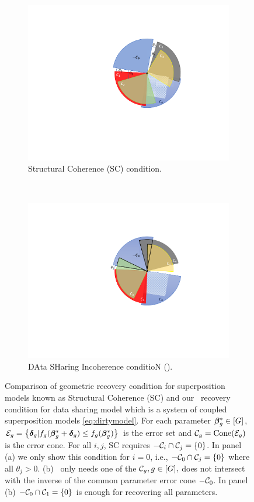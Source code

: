 \begin{figure}[h]
	\centering
	\begin{subfigure}[t]{0.2\textwidth}
		\includegraphics[width=\textwidth]{./img/sc.pdf}
		\caption{Structural Coherence (SC) condition.}\label{fig:sc}
	\end{subfigure} 
	~~~~~~~~
	\begin{subfigure}[t]{0.2\textwidth}
		\includegraphics[width=\textwidth]{./img/deric.pdf}
		\caption{DAta SHaring Incoherence conditioN (\ds).}
		\label{fig:DASHIN}
	\end{subfigure}
	\caption{\small Comparison of geometric recovery condition for superposition models known as Structural Coherence (SC) \cite{guba16} and our \ds\ recovery condition for data sharing model which is a system of coupled superposition models \eqref{eq:dirtymodel}. For each parameter $\boldsymbol{\beta}^*_g \in [G]$, $\cE_g = \left\{\ddelta_g | f_g(\bbeta _g^* + \ddelta_g) \leq f_g(\bbeta _g^*)\right\}$ is the error set and $\cC_g = \text{Cone}(\cE_g)$ is the error cone. For all $i,j$, SC requires $-\cC_i \cap \cC_j = \{0\}$. In panel (a) we only show this condition for $i = 0$, i.e., $-\cC_0 \cap \cC_j = \{0\}$ where all $\theta_j > 0$. (b) \ds\ only needs one of the $\cC_g, g \in [G],$ does not intersect with the inverse of the common parameter error cone $-\cC_0$. In panel (b) $-\cC_0 \cap \cC_1 = \{0\}$ is enough for recovering all parameters.}
	\label{fig syn2}
\end{figure}


